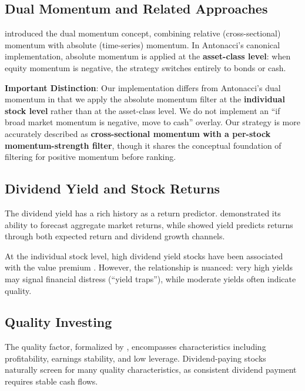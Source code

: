 \documentclass[12pt,a4paper]{article}
\theoremstyle{definition}
\begin{document}
\subsection{Dual Momentum and Related Approaches}

\citet{antonacci2014dual} introduced the dual momentum concept, combining relative (cross-sectional) momentum with absolute (time-series) momentum. In Antonacci's canonical implementation, absolute momentum is applied at the \textbf{asset-class level}: when equity momentum is negative, the strategy switches entirely to bonds or cash.

\textbf{Important Distinction}: Our implementation differs from Antonacci's dual momentum in that we apply the absolute momentum filter at the \textbf{individual stock level} rather than at the asset-class level. We do not implement an ``if broad market momentum is negative, move to cash'' overlay. Our strategy is more accurately described as \textbf{cross-sectional momentum with a per-stock momentum-strength filter}, though it shares the conceptual foundation of filtering for positive momentum before ranking.

\subsection{Dividend Yield and Stock Returns}

The dividend yield has a rich history as a return predictor. \citet{fama1988dividend} demonstrated its ability to forecast aggregate market returns, while \citet{campbell1988stock} showed yield predicts returns through both expected return and dividend growth channels.

At the individual stock level, high dividend yield stocks have been associated with the value premium \citep{fama1992cross}. However, the relationship is nuanced: very high yields may signal financial distress (``yield traps''), while moderate yields often indicate quality.

\subsection{Quality Investing}

The quality factor, formalized by \citet{asness2019quality}, encompasses characteristics including profitability, earnings stability, and low leverage. Dividend-paying stocks naturally screen for many quality characteristics, as consistent dividend payment requires stable cash flows.
\end{document}
